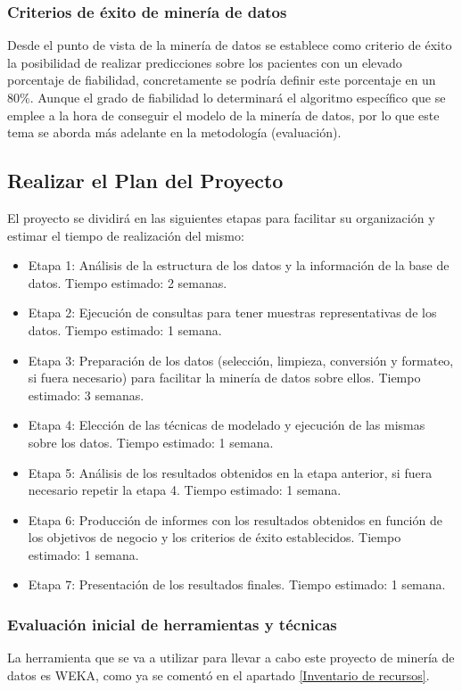 \documentclass{article}
\begin{document}
\subsubsection{Criterios de éxito de minería de datos}
Desde el punto de vista de la minería de datos se establece como criterio de éxito la posibilidad de realizar predicciones sobre los pacientes con un elevado porcentaje de fiabilidad, concretamente se podría definir este porcentaje en un 80\%. Aunque el grado de fiabilidad lo determinará el algoritmo específico que se emplee a la hora de conseguir el modelo de la minería de datos, por lo que este tema se aborda más adelante en la metodología (evaluación).

\subsection{Realizar el Plan del Proyecto}
El proyecto se dividirá en las siguientes etapas para facilitar su organización y estimar el tiempo de realización del mismo:

\begin{itemize}
	\item Etapa 1: Análisis de la estructura de los datos y la información de la base de datos. Tiempo estimado: 2 semanas.
	\item Etapa 2: Ejecución de consultas para tener muestras representativas de los datos. Tiempo estimado: 1 semana.
	\item Etapa 3: Preparación de los datos (selección, limpieza, conversión y formateo, si fuera necesario) para facilitar la minería de datos sobre ellos. Tiempo estimado: 3 semanas.
	\item Etapa 4: Elección de las técnicas de modelado y ejecución de las mismas sobre los datos. Tiempo estimado: 1 semana.
	\item Etapa 5: Análisis de los resultados obtenidos en la etapa anterior, si fuera necesario repetir la etapa 4. Tiempo estimado: 1 semana.
	\item Etapa 6: Producción de informes con los resultados obtenidos en función de los objetivos de negocio y los criterios de éxito establecidos. Tiempo estimado: 1 semana.
	\item Etapa 7: Presentación de los resultados finales. Tiempo estimado: 1 semana.
\end{itemize}

\subsubsection{Evaluación inicial de herramientas y técnicas}\label{Evaluación inicial de herramientas y técnicas}
La herramienta que se va a utilizar para llevar a cabo este proyecto de minería de datos es WEKA, como ya se comentó en el apartado \ref{Inventario de recursos}. 
\end{document}
